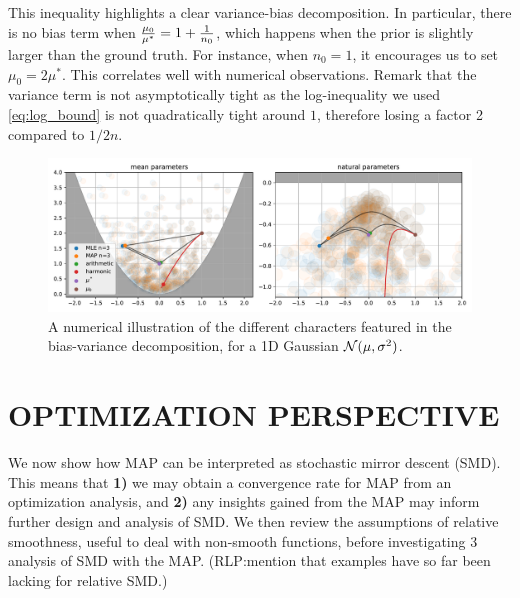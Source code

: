\documentclass[twoside]{article}
\let\oldsection\section
\renewcommand{\section}[1]{\oldsection{\texorpdfstring{\uppercase{#1}}{#1}}}
\newcommand{\rlp}[1]{\textcolor{BrickRed}{(RLP:#1)}}
\newcommand{\m}{\mu}
\begin{document}
This inequality highlights a clear variance-bias decomposition.
In particular, there is no bias term when $\frac{\m_0}{\m^*} =1 + \inv{n_0} $, which happens when the prior is slightly larger than the ground truth.  For instance, when $n_0=1$, it encourages us to set $\m_0 = 2 \m^*$. This correlates well with numerical observations.
Remark that the variance term is not asymptotically tight as the log-inequality we used \eqref{eq:log_bound} is not quadratically tight around $1$, therefore losing a factor 2 compared to $1/2n$.


\begin{figure}[t]
	\centering
	\includegraphics[width=\textwidth]{figs/thales/numerical_schema_n=3.pdf}
	\caption{A numerical illustration of the different characters featured in the bias-variance decomposition, for a 1D Gaussian ${\mathcal N}(\mu, \sigma^2)$.}
	\label{fig:bias-variance-numerical}
\end{figure}


\section{Optimization Perspective}
\label{sec:optimization}

We now show how MAP can be interpreted as stochastic mirror descent (SMD).
This means that \textbf{1)} we may obtain a convergence rate for MAP from an optimization analysis, and \textbf{2)} any insights gained from the MAP may inform further design and analysis of SMD.
We then review the assumptions of relative smoothness, useful to deal with non-smooth functions, before investigating 3 analysis of SMD with the MAP.
\rlp{mention that examples have so far been lacking for relative SMD.}
\end{document}
